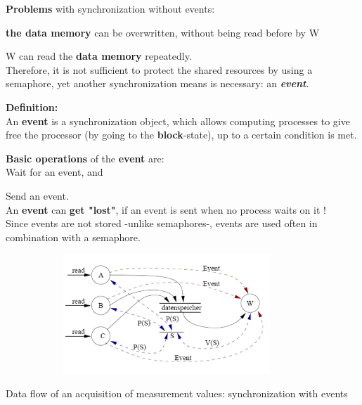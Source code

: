 \textbf{Problems} with synchronization without events:

\hspace{1cm} \textbf{the data memory} can be overwritten, without being read before by W
 
\hspace{1cm} W can read the \textbf{data memory} repeatedly.\\

Therefore, it is not sufficient to protect the shared resources by using a semaphore, yet another synchronization means is necessary: an \textbf{\textit{event}}.

\begin{tcolorbox}[colback=blue!5!white,colframe=blue!75!black]
 \textbf{Definition: }\\ An \textbf{event} is a synchronization object, which allows computing processes to give free the processor (by going to the \textbf{block}-state), up to a certain condition is met.
\end{tcolorbox}

\textbf{Basic operations} of the \textbf{event} are:\\

\hspace{1cm}  Wait for an event, and

\hspace{1cm}  Send an event.\\

An \textbf{event} can\textbf{ get "lost"}, if an event is sent when no process waits on it  !\\
Since events are not stored -unlike semaphores-, events are used often in combination with a semaphore.

 	\begin{figure}[h]
    \centering
    \includegraphics[width=10cm, height=4.5cm]{Images/image18.png}
    \label{fig:Fig 58}
    \end{figure}

Data flow of an acquisition of measurement values: synchronization with events

